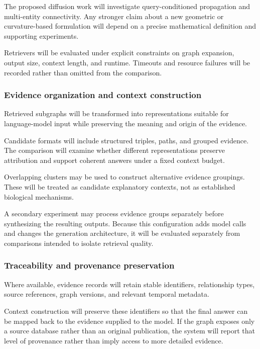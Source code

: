 The proposed diffusion work will investigate query-conditioned propagation and multi-entity connectivity. Any stronger claim about a new geometric or curvature-based formulation will depend on a precise mathematical definition and supporting experiments.

Retrievers will be evaluated under explicit constraints on graph expansion, output size, context length, and runtime. Timeouts and resource failures will be recorded rather than omitted from the comparison.

\subsubsection{Evidence organization and context construction}\label{evidence-organization-and-context-construction}

Retrieved subgraphs will be transformed into representations suitable for language-model input while preserving the meaning and origin of the evidence.

Candidate formats will include structured triples, paths, and grouped evidence. The comparison will examine whether different representations preserve attribution and support coherent answers under a fixed context budget.

Overlapping clusters may be used to construct alternative evidence groupings. These will be treated as candidate explanatory contexts, not as established biological mechanisms.

A secondary experiment may process evidence groups separately before synthesizing the resulting outputs. Because this configuration adds model calls and changes the generation architecture, it will be evaluated separately from comparisons intended to isolate retrieval quality.

\subsubsection{Traceability and provenance preservation}\label{traceability-and-provenance-preservation}


Where available, evidence records will retain stable identifiers, relationship types, source references, graph versions, and relevant temporal metadata.

Context construction will preserve these identifiers so that the final answer can be mapped back to the evidence supplied to the model. If the graph exposes only a source database rather than an original publication, the system will report that level of provenance rather than imply access to more detailed evidence.

